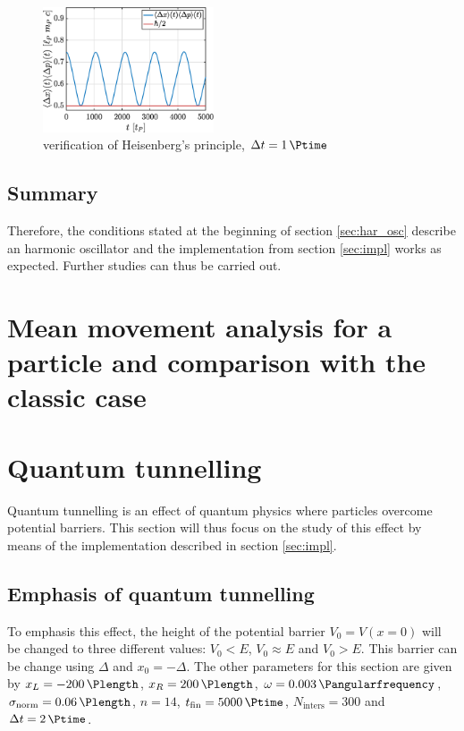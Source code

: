 \documentclass[a4paper,12pt,twoside]{article}
\begin{document}
    \begin{figure}[h]
      \centering
      \includegraphics[width=0.45\textwidth]{graphs/i_heisenberg.eps}
      \caption{verification of Heisenberg's principle, $\Delta t = \SI{1}{\Ptime}$}
      \label{fig:i_heisenberg}
    \end{figure}

    \subsection{Summary}
    Therefore, the conditions stated at the beginning of section \ref{sec:har_osc} describe an harmonic oscillator and the implementation from section \ref{sec:impl} works as expected.
    Further studies can thus be carried out.


\newpage
\section{Mean movement analysis for a particle and comparison with the classic case}


\newpage
\section{Quantum tunnelling}\label{sec:quantum_tunnelling}
  Quantum tunnelling is an effect of quantum physics where particles overcome potential barriers. \cite{wiki:quantum_tunnelling}
  This section will thus focus on the study of this effect by means of the implementation described in section \ref{sec:impl}.\\

  \subsection{Emphasis of quantum tunnelling}
    To emphasis this effect, the height of the potential barrier $V_0 = V(x=0)$ will be changed to three different values: $V_0<E$, $V_0 \approx E$ and $V_0>E$.
    This barrier can be change using $\Delta$ and $x_0 = -\Delta$.
    The other parameters for this section are given by $x_L=\SI{-200}{\Plength}$, $x_R=\SI{200}{\Plength}$, $\omega = \SI{0.003}{\Pangularfrequency}$, $\sigma_\text{norm} = \SI{0.06}{\Plength}$, $n=14$, $t_\text{fin} = \SI{5000}{\Ptime}$, $N_\text{inters} = 300$ and $\Delta t = \SI{2}{\Ptime}$.\\
\end{document}

